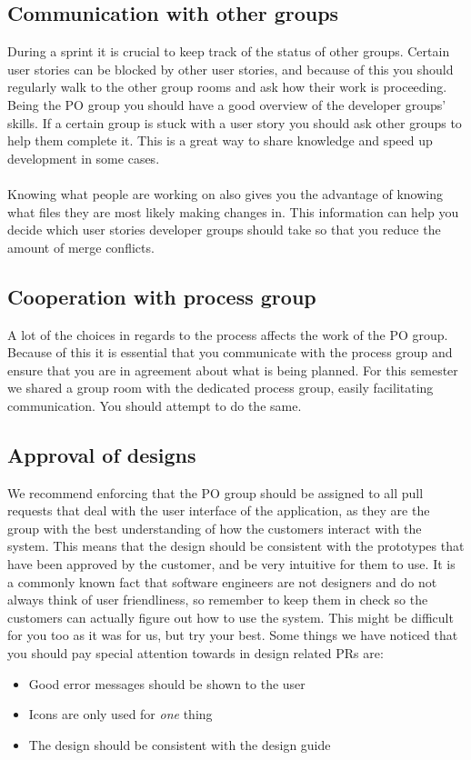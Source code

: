 \subsection{Communication with other groups}
During a sprint it is crucial to keep track of the status of other groups.
Certain user stories can be blocked by other user stories, and because of this you should regularly walk to the other group rooms and ask how their work is proceeding.
Being the PO group you should have a good overview of the developer groups' skills.
If a certain group is stuck with a user story you should ask other groups to help them complete it.
This is a great way to share knowledge and speed up development in some cases.
\\\\
Knowing what people are working on also gives you the advantage of knowing what files they are most likely making changes in.
This information can help you decide which user stories developer groups should take so that you reduce the amount of merge conflicts.


\subsection{Cooperation with process group}
A lot of the choices in regards to the process affects the work of the PO group.
Because of this it is essential that you communicate with the process group and ensure that you are in agreement about what is being planned.
For this semester we shared a group room with the dedicated process group, easily facilitating communication. 
You should attempt to do the same.

\subsection{Approval of designs}
We recommend enforcing that the PO group should be assigned to all pull requests that deal with the user interface of the application, as they are the group with the best understanding of how the customers interact with the system.
This means that the design should be consistent with the prototypes that have been approved by the customer, and be very intuitive for them to use.
It is a commonly known fact that software engineers are not designers and do not always think of user friendliness, so remember to keep them in check so the customers can actually figure out how to use the system.
This might be difficult for you too as it was for us, but try your best.
Some things we have noticed that you should pay special attention towards in design related PRs are: 
\begin{itemize}
    \item Good error messages should be shown to the user
    \item Icons are only used for \textit{one} thing
    \item The design should be consistent with the design guide
\end{itemize}

